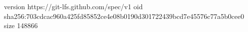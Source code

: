 version https://git-lfs.github.com/spec/v1
oid sha256:703cdcac960a425fd85852ce4e08b0190d301722439bcd7e45576c77a5b0cee0
size 148866
